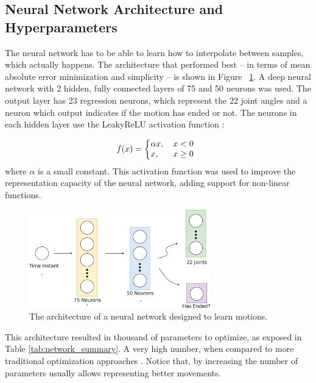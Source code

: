 \subsection{Neural Network Architecture and Hyperparameters}

The neural network has to be able to learn how to interpolate between samples, which actually happens. The architecture that performed best -- in terms of mean absolute error minimization and simplicity -- is shown in Figure ~\ref{fig:model_plot}. A deep neural network with 2 hidden, fully connected layers of 75 and 50 neurons was used. The output layer has 23 regression neurons, which represent the 22 joint angles and a neuron which output indicates if the motion has ended or not. The neurons in each hidden layer use the LeakyReLU activation function \cite{leakyrelu}: 

\[
  f(x) = \left\{
     \begin{array}{@{}l@{\thinspace}l}
       \alpha x,   & \quad x < 0  \\
       x, & \quad x \ge0 \\
     \end{array}
   \right.
\]
where $\alpha$ is a small constant. This activation function was used to improve the representation capacity of the neural network, adding support for non-linear functions.

\begin{figure}[!htbp]
\centering
\includegraphics[width=0.7\textwidth]{Cap5/architecture}
\caption{The architecture of a neural network designed to learn motions.}
\label{fig:model_plot}
\end{figure}

This architecture resulted in thousand of parameters to optimize, as exposed in Table \ref{tab:network_summary}. A very high number, when compared to more traditional optimization approaches \cite{AAAI12-MacAlpine}. Notice that, by increasing the number of parameters usually allows representing better movements.

